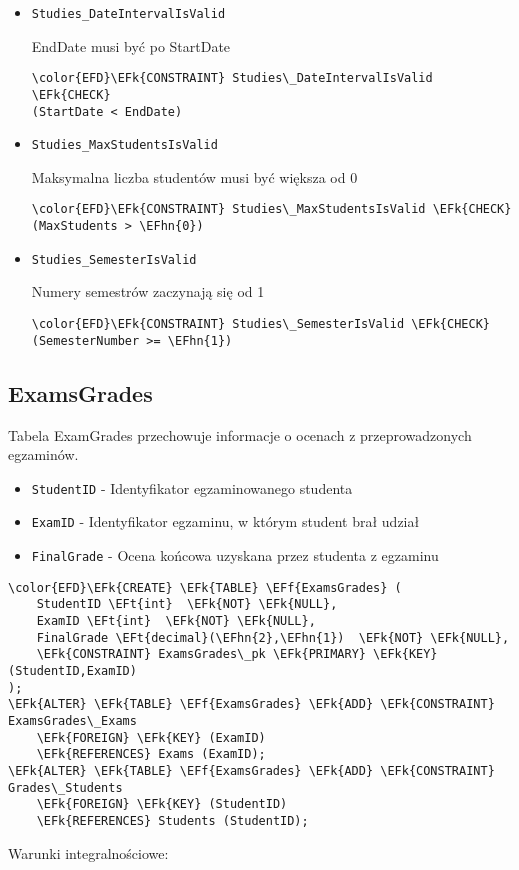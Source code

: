 \documentclass[11pt]{article}
\newcommand{\EFk}[1]{\textcolor{EFk}{\textbf{#1}}} %
\newcommand{\EFf}[1]{\textcolor{EFf}{#1}} %
\newcommand{\EFt}[1]{\textcolor{EFt}{\textbf{#1}}} %
\newcommand{\EFhn}[1]{\textcolor{EFhn}{#1}} %
\begin{document}
\begin{itemize}
\item \texttt{Studies\_DateIntervalIsValid}

EndDate musi być po StartDate
\begin{Code}
\begin{Verbatim}
\color{EFD}\EFk{CONSTRAINT} Studies\_DateIntervalIsValid \EFk{CHECK}
(StartDate < EndDate)
\end{Verbatim}
\end{Code}
\item \texttt{Studies\_MaxStudentsIsValid}

Maksymalna liczba studentów musi być większa od 0
\begin{Code}
\begin{Verbatim}
\color{EFD}\EFk{CONSTRAINT} Studies\_MaxStudentsIsValid \EFk{CHECK}
(MaxStudents > \EFhn{0})
\end{Verbatim}
\end{Code}
\item \texttt{Studies\_SemesterIsValid}

Numery semestrów zaczynają się od 1
\begin{Code}
\begin{Verbatim}
\color{EFD}\EFk{CONSTRAINT} Studies\_SemesterIsValid \EFk{CHECK}
(SemesterNumber >= \EFhn{1})
\end{Verbatim}
\end{Code}
\end{itemize}
\subsection{ExamsGrades}
\label{sec:org1225e0f}
Tabela ExamGrades przechowuje informacje o ocenach z przeprowadzonych egzaminów.
\begin{itemize}
\item \texttt{StudentID} - Identyfikator egzaminowanego studenta
\item \texttt{ExamID} - Identyfikator egzaminu, w którym student brał udział
\item \texttt{FinalGrade} - Ocena końcowa uzyskana przez studenta z egzaminu
\end{itemize}
\begin{Code}
\begin{Verbatim}
\color{EFD}\EFk{CREATE} \EFk{TABLE} \EFf{ExamsGrades} (
    StudentID \EFt{int}  \EFk{NOT} \EFk{NULL},
    ExamID \EFt{int}  \EFk{NOT} \EFk{NULL},
    FinalGrade \EFt{decimal}(\EFhn{2},\EFhn{1})  \EFk{NOT} \EFk{NULL},
    \EFk{CONSTRAINT} ExamsGrades\_pk \EFk{PRIMARY} \EFk{KEY}  (StudentID,ExamID)
);
\EFk{ALTER} \EFk{TABLE} \EFf{ExamsGrades} \EFk{ADD} \EFk{CONSTRAINT} ExamsGrades\_Exams
    \EFk{FOREIGN} \EFk{KEY} (ExamID)
    \EFk{REFERENCES} Exams (ExamID);
\EFk{ALTER} \EFk{TABLE} \EFf{ExamsGrades} \EFk{ADD} \EFk{CONSTRAINT} Grades\_Students
    \EFk{FOREIGN} \EFk{KEY} (StudentID)
    \EFk{REFERENCES} Students (StudentID);
\end{Verbatim}
\end{Code}
Warunki integralnościowe:
\end{document}
